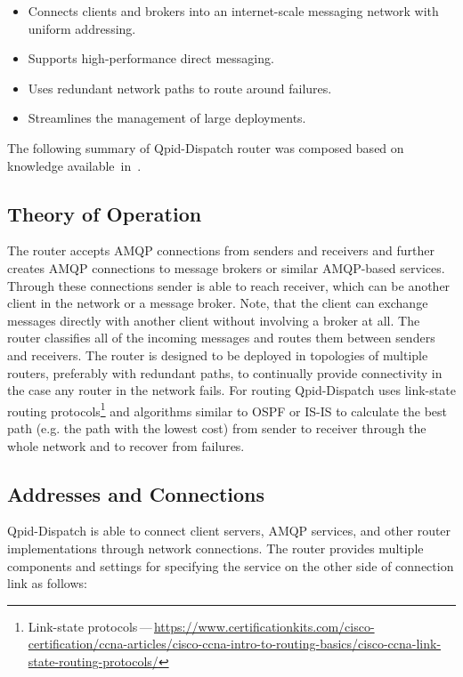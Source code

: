 \begin{itemize}
	\setlength\itemsep{0em}
	\item Connects clients and brokers into an internet-scale messaging network with uniform addressing.
	\item Supports high-performance direct messaging.
	\item Uses redundant network paths to route around failures.
	\item Streamlines the management of large deployments.
\end{itemize}
The following summary of Qpid-Dispatch router was composed based on knowledge available~in~\cite{RH:Interconnect}.


\subsection{Theory of Operation}
The router accepts AMQP connections from senders and receivers and further creates AMQP connections to message brokers or similar AMQP-based services. Through these connections sender is able to reach receiver, which can be another client in the network or a message broker. Note, that the client can exchange messages directly with another client without involving a broker at all. The router classifies all of the incoming messages and routes them between senders and receivers. The router is designed to be deployed in topologies of multiple routers, preferably with redundant paths, to continually provide connectivity in the case any router in the network fails. For routing Qpid-Dispatch uses link-state routing protocols\footnote{Link-state protocols\,---\,\url{https://www.certificationkits.com/cisco-certification/ccna-articles/cisco-ccna-intro-to-routing-basics/cisco-ccna-link-state-routing-protocols/}} and algorithms similar to OSPF or IS-IS to calculate the best path (e.g. the path with the lowest cost) from sender to receiver through the whole network and to recover from failures.

\subsection{Addresses and Connections}
\label{Addresses and Connections}
Qpid-Dispatch is able to connect client servers, AMQP services, and other router implementations through network connections. The router provides multiple components and settings for specifying the service on the other side of connection link as follows:

